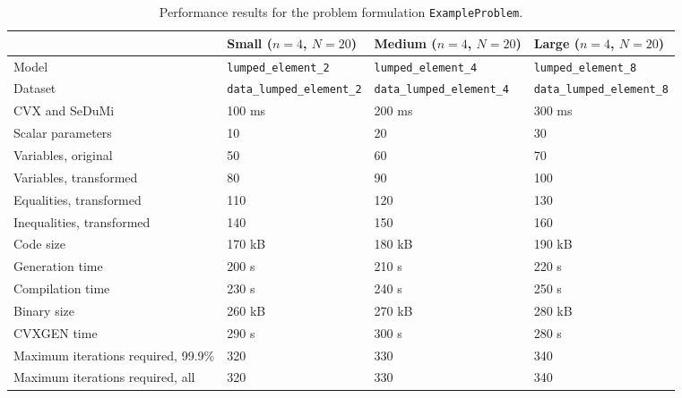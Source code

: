 \begin{table*}[t!]
\centering
\caption{Performance results for the problem formulation \texttt{ExampleProblem}.}
\begin{tabularx}{\textwidth}{lXXX}
\hline
 & Small ($n=4$, $N=20$) & Medium ($n=4$, $N=20$) & Large ($n=4$, $N=20$) \\
\hline
Model &\texttt{lumped\_element\_2} &\texttt{lumped\_element\_4} &\texttt{lumped\_element\_8} \\
Dataset &\texttt{data\_lumped\_element\_2} &\texttt{data\_lumped\_element\_4} &\texttt{data\_lumped\_element\_8} \\
CVX and SeDuMi                      & 100 ms     & 200 ms         & 300 ms \\
Scalar parameters                   & 10            & 20                & 30 \\
Variables, original                 & 50            & 60                & 70 \\
Variables, transformed              & 80           & 90               & 100 \\
Equalities, transformed             & 110             & 120                 & 130 \\
Inequalities, transformed           & 140            & 150                & 160 \\
Code size                           & 170 kB    & 180 kB        & 190 kB \\
Generation time                     & 200 s      & 210 s          & 220 s \\
Compilation time                    & 230 s     & 240 s         & 250 s \\
Binary size                         & 260 kB  & 270 kB      &280 kB \\
CVXGEN time                         & 290 s   & 300 s       &280 s \\
Maximum iterations required, 99.9\% & 320           & 330               & 340 \\
Maximum iterations required, all    & 320           & 330               & 340 \\
\hline
\end{tabularx}
\end{table*}